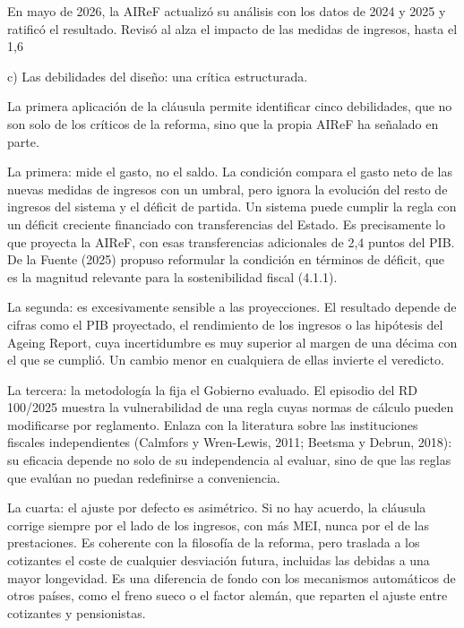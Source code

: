 \documentclass[10pt,a4paper]{article}
\begin{document}
En mayo de 2026, la AIReF actualizó su análisis con los datos de 2024 y 2025 y ratificó el resultado. Revisó al alza el impacto de las medidas de ingresos, hasta el 1,6%

c) Las debilidades del diseño: una crítica estructurada.

La primera aplicación de la cláusula permite identificar cinco debilidades, que no son solo de los críticos de la reforma, sino que la propia AIReF ha señalado en parte.

La primera: mide el gasto, no el saldo. La condición compara el gasto neto de las nuevas medidas de ingresos con un umbral, pero ignora la evolución del resto de ingresos del sistema y el déficit de partida. Un sistema puede cumplir la regla con un déficit creciente financiado con transferencias del Estado. Es precisamente lo que proyecta la AIReF, con esas transferencias adicionales de 2,4 puntos del PIB. De la Fuente (2025) propuso reformular la condición en términos de déficit, que es la magnitud relevante para la sostenibilidad fiscal (4.1.1).

La segunda: es excesivamente sensible a las proyecciones. El resultado depende de cifras como el PIB proyectado, el rendimiento de los ingresos o las hipótesis del Ageing Report, cuya incertidumbre es muy superior al margen de una décima con el que se cumplió. Un cambio menor en cualquiera de ellas invierte el veredicto.

La tercera: la metodología la fija el Gobierno evaluado. El episodio del RD 100/2025 muestra la vulnerabilidad de una regla cuyas normas de cálculo pueden modificarse por reglamento. Enlaza con la literatura sobre las instituciones fiscales independientes (Calmfors y Wren-Lewis, 2011; Beetsma y Debrun, 2018): su eficacia depende no solo de su independencia al evaluar, sino de que las reglas que evalúan no puedan redefinirse a conveniencia.

La cuarta: el ajuste por defecto es asimétrico. Si no hay acuerdo, la cláusula corrige siempre por el lado de los ingresos, con más MEI, nunca por el de las prestaciones. Es coherente con la filosofía de la reforma, pero traslada a los cotizantes el coste de cualquier desviación futura, incluidas las debidas a una mayor longevidad. Es una diferencia de fondo con los mecanismos automáticos de otros países, como el freno sueco o el factor alemán, que reparten el ajuste entre cotizantes y pensionistas.
\end{document}
